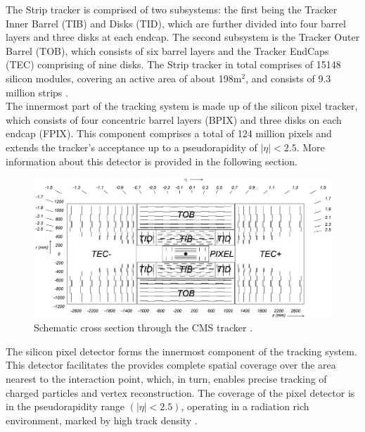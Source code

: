 The Strip tracker is comprised of two subsystems: the first being the Tracker Inner Barrel (TIB) and Disks (TID), which are further divided into four barrel layers and three disks at each endcap. The second subsystem is the Tracker Outer Barrel (TOB), which consists of six barrel layers and the Tracker EndCaps (TEC) comprising of nine disks. The Strip tracker in total comprises of 15148 silicon modules, covering an active area of about 198$\text{m}^{2}$, and consists of 9.3 million strips \cite{CMS_Exp_2008}. \\

The innermost part of the tracking system is made up of the silicon pixel tracker, which consists of four concentric barrel layers (BPIX) and three disks on each endcap (FPIX). This component comprises a total of 124 million pixels and extends the tracker's acceptance up to a pseudorapidity of $|\eta| < 2.5$. More information about this detector is provided in the following section.

\begin{center}
  \begin{figure}[ht]
    \centering
    \includegraphics[scale=.23]{Chapter2/strip_layout.png}
    \caption[Schematic cross section through the CMS tracker]{Schematic cross section through the CMS tracker \cite{CMS_Exp_2008}.}
    \label{strip_layout}
  \end{figure}
\end{center}


The silicon pixel detector  forms the innermost component of the tracking system. This detector facilitates the provides complete spatial coverage over the area nearest to the interaction point, which, in turn, enables precise tracking of charged particles and vertex reconstruction. The coverage of the pixel detector is in the pseudorapidity range $(|\eta| < 2.5)$, operating in a radiation rich environment, marked by high track density \cite{phase1_Pixel_Detector}.\\

